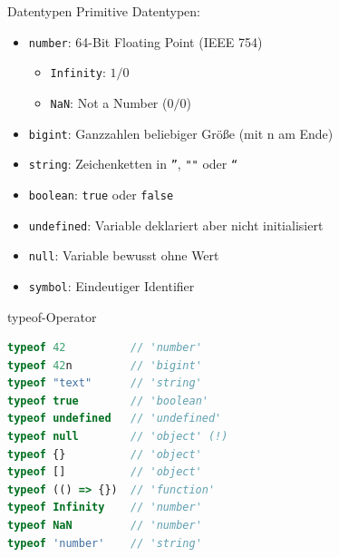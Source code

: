 \begin{definition}{Datentypen}
    Primitive Datentypen:
    \begin{itemize}
        \item \texttt{number}: 64-Bit Floating Point (IEEE 754)
            \begin{itemize}
                \item \texttt{Infinity}: $1/0$
                \item \texttt{NaN}: Not a Number ($0/0$)
            \end{itemize}
        \item \texttt{bigint}: Ganzzahlen beliebiger Größe (mit n am Ende)
        \item \texttt{string}: Zeichenketten in \texttt{''}, \texttt{""} oder \texttt{``}
        \item \texttt{boolean}: \texttt{true} oder \texttt{false}
        \item \texttt{undefined}: Variable deklariert aber nicht initialisiert
        \item \texttt{null}: Variable bewusst ohne Wert
        \item \texttt{symbol}: Eindeutiger Identifier
    \end{itemize}
\end{definition}

\begin{KR}{typeof-Operator}
\begin{lstlisting}[language=JavaScript, style=basesmol]
typeof 42          // 'number'
typeof 42n         // 'bigint'
typeof "text"      // 'string'
typeof true        // 'boolean'
typeof undefined   // 'undefined'
typeof null        // 'object' (!)
typeof {}          // 'object'
typeof []          // 'object'
typeof (() => {})  // 'function'
typeof Infinity    // 'number'
typeof NaN         // 'number'
typeof 'number'    // 'string'
\end{lstlisting}
\end{KR}

